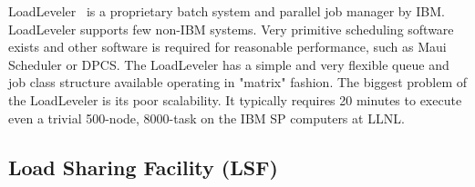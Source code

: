 LoadLeveler~\cite{LoadLevelerManual,LoadLevelerWeb}
is a proprietary batch system and parallel job manager by
IBM. LoadLeveler supports few non-IBM systems. Very primitive
scheduling software exists and other software is required for reasonable
performance, such as Maui Scheduler or DPCS.
The LoadLeveler has a  simple and very flexible queue and job class structure available
operating in "matrix" fashion.
The biggest problem of the LoadLeveler is its poor scalability.
It typically requires 20 minutes to execute even a trivial 500-node, 8000-task
on the IBM SP computers at LLNL.
%
%
%
%
\subsection*{Load Sharing Facility (LSF)}

